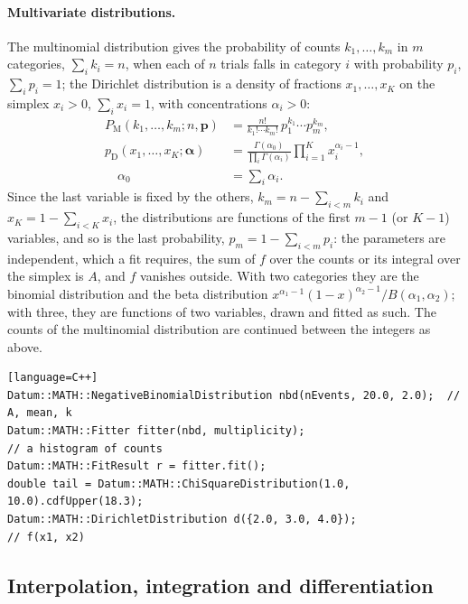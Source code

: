 \paragraph{Multivariate distributions.}
The multinomial distribution gives the probability of counts $k_1, \dots, k_m$ in $m$ categories, $\sum_i k_i = n$,
when each of $n$ trials falls in category $i$ with probability $p_i$, $\sum_i p_i = 1$; the Dirichlet distribution is
a density of fractions $x_1, \dots, x_K$ on the simplex $x_i > 0$, $\sum_i x_i = 1$, with concentrations
$\alpha_i > 0$:
\begin{align}
  P_{\mathrm{M}}(k_1,\dots,k_m; n, \mathbf{p}) &= \frac{n!}{k_1! \cdots k_m!}\, p_1^{k_1} \cdots p_m^{k_m}, \qquad \\
  p_{\mathrm{D}}(x_1,\dots,x_K;\boldsymbol{\alpha})& = \frac{\Gamma(\alpha_0)}{\prod_i \Gamma(\alpha_i)} 
     \prod_{i=1}^{K} x_i^{\alpha_i - 1},\\ \quad \alpha_0 &= \sum_i \alpha_i .
\end{align}
Since the last variable is fixed by the others, $k_m = n - \sum_{i<m} k_i$ and $x_K = 1 - \sum_{i<K} x_i$, the
distributions are functions of the first $m-1$ (or $K-1$) variables, and so is the last probability,
$p_m = 1 - \sum_{i<m} p_i$: the parameters are independent, which a fit requires, the sum of $f$ over the counts or
its integral over the simplex is $A$, and $f$ vanishes outside. With two categories they are the binomial
distribution and the beta distribution $x^{\alpha_1-1}(1-x)^{\alpha_2-1}/B(\alpha_1,\alpha_2)$; with three, they are
functions of two variables, drawn and fitted as such. The counts of the multinomial distribution are continued
between the integers as above.
\begin{widetext}
\begin{verbatim}[language=C++]
Datum::MATH::NegativeBinomialDistribution nbd(nEvents, 20.0, 2.0);  // A, mean, k
Datum::MATH::Fitter fitter(nbd, multiplicity);                       // a histogram of counts
Datum::MATH::FitResult r = fitter.fit();
double tail = Datum::MATH::ChiSquareDistribution(1.0, 10.0).cdfUpper(18.3);
Datum::MATH::DirichletDistribution d({2.0, 3.0, 4.0});               // f(x1, x2)
\end{verbatim}
\end{widetext}

\subsection{Interpolation, integration and differentiation}
\label{sec:numerics}


